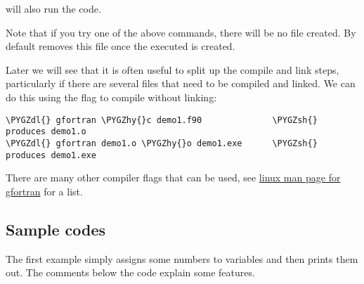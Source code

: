 \documentclass[letterpaper,10pt,english]{sphinxmanual}
\def\PYGZsh{\char`\#}
\def\PYGZdl{\char`\$}
\def\PYGZhy{\char`\-}
\begin{document}
will also run the code.

Note that if you try one of the above commands, there will be no file
 created.  By default  removes this file once the
executed is created.

Later we will see that it is often useful to split up the compile and
link steps, particularly if there are several files that need to be
compiled and linked.  We can do this using the  flag to compile
without linking:

\begin{Verbatim}[commandchars=\\\{\}]
\PYGZdl{} gfortran \PYGZhy{}c demo1.f90              \PYGZsh{} produces demo1.o
\PYGZdl{} gfortran demo1.o \PYGZhy{}o demo1.exe      \PYGZsh{} produces demo1.exe
\end{Verbatim}

There are many other compiler flags that can be used, see
\href{http://linux.die.net/man/1/gfortran}{linux man page for gfortran} for a list.


\subsection{Sample codes}
\label{fortran:fortran-ex1}\label{fortran:sample-codes}
The first example simply assigns some numbers to variables and then
prints them out.   The comments below the code explain some features.
\end{document}

